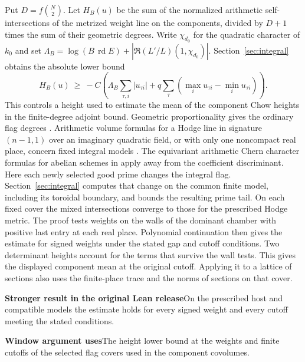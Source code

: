\documentclass[11pt,a4paper]{article}
\newcommand{\rhscopelabel}[2]{%
  {\setlength{\fboxsep}{2pt}\colorbox{#1}{%
    \small\sffamily\bfseries\color{PageInk}#2}}}
\newcommand{\rhrange}[3][Stronger result in the original Lean release]{%
  \par\addvspace{.45\baselineskip}\Needspace{4\baselineskip}%
  \begingroup\setlength{\leftskip}{.65em}\setlength{\parindent}{0pt}%
  \noindent\rhscopelabel{TraceTint}{#1}\enspace#2\par
  \nobreak\smallskip
  \noindent\rhscopelabel{FieldTint}{Window argument uses}\enspace#3\par
  \endgroup\addvspace{.45\baselineskip}}
\begin{document}
Put \(D=f\binom N2\). Let \(H_B(u)\) be the sum of the normalized
arithmetic self-intersections of the metrized weight line on the
components, divided by \(D+1\) times the sum of their geometric
degrees. Write \(\chi_{d_0}\) for the quadratic character of \(k_0\) and set
\(\Lambda_B=\log(B\,\operatorname{rd}E)+|\Re(L'/L)(1,\chi_{d_0})|\).
Section~\ref{sec:integral} obtains the absolute lower bound
\[
 H_B(u)\ \ge\ -C\left(\Lambda_B\sum_{\tau,i}|u_{\tau i}|
              +q\sum_\tau(\max_i u_{\tau i}-\min_i u_{\tau i})\right).
\]
This controls a height used to estimate the mean of the component Chow
heights in the finite-degree adjoint bound. Geometric proportionality
gives the ordinary flag degrees \cite{flag-hormann}. Arithmetic volume
formulas for a Hodge line in signature \((n-1,1)\) over an imaginary
quadratic field, or with only one noncompact real place, concern fixed
integral models \cite{flag-bruinier-howard,flag-guo}. The equivariant
arithmetic Chern character formulas for abelian schemes in
\cite{flag-maillot-rossler} apply away from the coefficient discriminant.
Here each newly selected good prime changes the integral flag.
Section~\ref{sec:integral} computes that change on the common finite
model, including its toroidal boundary, and bounds the resulting
prime tail. On each fixed cover the mixed intersections converge to
those for the prescribed Hodge metric. The proof tests weights on the
walls of the dominant chamber with positive last entry at each real
place. Polynomial continuation then gives the estimate for signed
weights under the stated gap and cutoff conditions. Two determinant
heights account for the terms
that survive the wall tests. This gives the displayed component mean
at the original cutoff. Applying it to a lattice of sections also
uses the finite-place trace and the norms of sections on that cover.
\rhrange{On the prescribed host and compatible models the estimate
holds for every signed weight and every cutoff meeting the stated
conditions.}
{The height lower bound at the weights and finite cutoffs of the
selected flag covers used in the component covolumes.}
\end{document}
